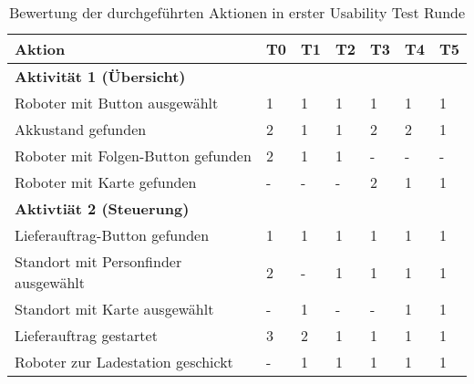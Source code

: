 \begin{table}[H]
    \caption{Bewertung der durchgeführten Aktionen in erster Usability Test Runde}\label{tbl:1stUsabilityTestsActions}
    \begin{tabular}{l|llllll}
        Aktion                              & T0        & T1        & T2        & T3        & T4        & T5        \\ \hline
        \textbf{Aktivität 1 (Übersicht)}    &           &           &           &           &           &           \\
        Roboter mit Button ausgewählt       &         1 &         1 &         1 &         1 &         1 &         1 \\
        Akkustand gefunden                  &         2 &         1 &         1 &         2 &         2 &         1 \\
        Roboter mit Folgen-Button gefunden  &         2 &         1 &         1 &         - &         - &         - \\
        Roboter mit Karte gefunden          &         - &         - &         - &         2 &         1 &         1 \\ \hline

        \textbf{Aktivtiät 2 (Steuerung)}    &           &           &           &           &           &           \\
        Lieferauftrag-Button gefunden       &         1 &         1 &         1 &         1 &         1 &         1 \\
        Standort mit Personfinder ausgewählt&         2 &         - &         1 &         1 &         1 &         1 \\
        Standort mit Karte ausgewählt       &         - &         1 &         - &         - &         1 &         1 \\
        Lieferauftrag gestartet             &         3 &         2 &         1 &         1 &         1 &         1 \\
        Roboter zur Ladestation geschickt   &         - &         1 &         1 &         1 &         1 &         1 \\ \hline


\end{tabular}
\end{table}
